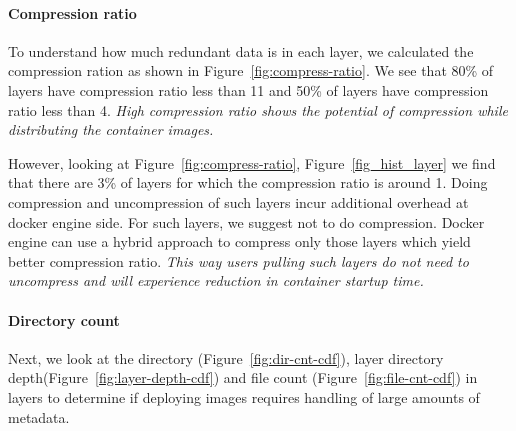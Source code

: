 \paragraph{Compression ratio}

To understand how much redundant data is in each layer, we calculated the
compression ration as shown in Figure~\ref{fig:compress-ratio}.
%
We see that 80\% of layers have compression ratio less than 11 and 50\% of
layers have compression ratio less than 4.
%
\emph{High compression ratio shows the potential of compression while
distributing the container images.}

However, looking at Figure~\ref{fig:compress-ratio},
Figure~\ref{fig_hist_layer} we find that there are 3\% of layers for which the
compression ratio is around 1.
%
Doing compression and uncompression of such layers incur additional overhead at
docker engine side.
%
For such layers, we suggest not to do compression.
%
Docker engine can use a hybrid approach to compress only those layers which
yield better compression ratio.
%
\emph{This way users pulling such layers do not need to uncompress and will
experience reduction in container startup time.}



\paragraph{Directory count}



Next, we look at the directory (Figure~\ref{fig:dir-cnt-cdf}), layer directory
depth(Figure~\ref{fig:layer-depth-cdf}) and file count
(Figure~\ref{fig:file-cnt-cdf}) in layers to determine if deploying images
requires handling of large amounts of metadata.

